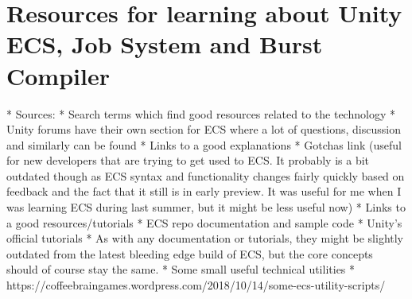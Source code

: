 \section{Resources for learning about Unity ECS, Job System and Burst Compiler}
* Sources:
  * Search terms which find good resources related to the technology
     * Unity forums have their own section for ECS where a lot of questions, discussion and similarly can be found
  * Links to a good explanations
     * Gotchas link (useful for new developers that are trying to get used to ECS. It probably is a bit outdated though as ECS syntax and functionality changes fairly quickly based on feedback and the fact that it still is in early preview. It was useful for me when I was learning ECS during last summer, but it might be less useful now)
  * Links to a good resources/tutorials
     * ECS repo documentation and sample code
     * Unity's official tutorials
     * As with any documentation or tutorials, they might be slightly outdated from the latest bleeding edge build of ECS, but the core concepts should of course stay the same. 
     * Some small useful technical utilities
        * https://coffeebraingames.wordpress.com/2018/10/14/some-ecs-utility-scripts/